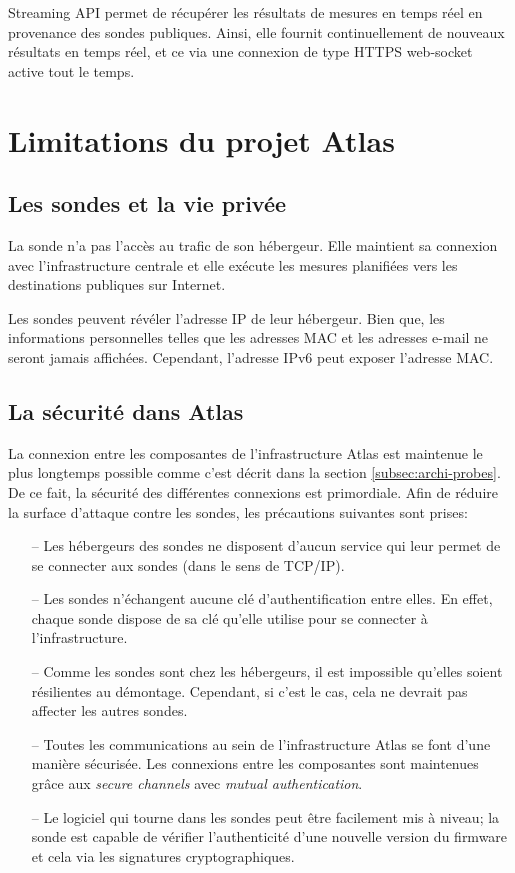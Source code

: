 Streaming API permet de récupérer les résultats de mesures en temps réel en provenance des sondes publiques. Ainsi, elle  fournit continuellement de nouveaux résultats en temps réel, et ce  via une connexion de type HTTPS web-socket active tout le temps.
\section{Limitations du projet Atlas}
\subsection{Les sondes  et la vie privée}
La sonde   n'a pas l'accès au trafic de son hébergeur. Elle maintient sa connexion avec l'infrastructure centrale et elle exécute les mesures planifiées vers les destinations publiques sur Internet. 

Les sondes   peuvent révéler l'adresse IP de leur hébergeur. Bien que, les informations personnelles telles que les adresses MAC et les adresses e-mail ne seront jamais affichées. Cependant, l'adresse IPv6 peut exposer l'adresse MAC. 

\subsection{La sécurité dans Atlas}

La connexion entre les composantes de l'infrastructure  Atlas est maintenue le plus longtemps possible comme c'est décrit dans  la section \ref{subsec:archi-probes}. De ce fait, la sécurité des différentes connexions est primordiale. Afin de réduire la surface d'attaque contre les sondes, les précautions suivantes sont prises:

\begin{itemize}
	\item[--] Les  hébergeurs des sondes   ne disposent d'aucun service qui leur permet de se connecter aux sondes (dans le sens de TCP/IP).
	\item[--] Les sondes    n'échangent aucune clé d'authentification entre elles. En effet, chaque sonde dispose de sa clé qu'elle utilise pour se connecter à l'infrastructure.
	\item[--] Comme les sondes   sont chez les hébergeurs, il est impossible qu'elles soient résilientes au démontage. Cependant, si c'est le cas, cela ne devrait pas affecter les autres sondes.
	\item[--] Toutes les communications au sein de l'infrastructure  Atlas se font d'une manière sécurisée. Les connexions entre les composantes sont maintenues grâce aux \textit{secure channels} avec \textit{mutual authentication}.
	\item[--] Le logiciel qui tourne dans les sondes   peut être facilement mis à niveau; la sonde   est capable de vérifier l'authenticité d'une nouvelle version du firmware et cela via les signatures cryptographiques. 
\end{itemize}

